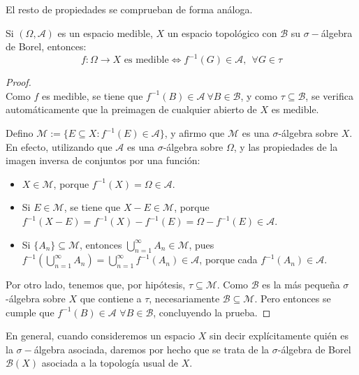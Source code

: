 El resto de propiedades se comprueban de forma análoga.

\begin{nprop}Si $(\Omega,\mathscr A)$ es un espacio medible, $X$ un espacio topológico con $\mathcal B$ su $\sigma-$álgebra de Borel, entonces:
  \[
    f: \Omega \to X \text{ es medible} \iff f^{-1}(G) \in \mathscr A, \ \ \forall G \in \tau
  \]
\end{nprop}

  \begin{proof} \hfill \\
	\boxed{\Rightarrow} Como $f$ es medible, se tiene que $f^{-1}(B) \in \mathscr A \ \forall B \in \mathcal B$, y como $\tau \subseteq \mathcal B$, se verifica automáticamente que la preimagen de cualquier abierto de $X$ es medible.

\boxed{\Leftarrow} Defino $\mathcal M := \{ E \subseteq X: f^{-1}(E) \in \mathscr A\}$, y afirmo que $\mathcal M$ es una $\sigma$-álgebra sobre $X$. En efecto, utilizando que $\mathscr A$ es una $\sigma$-álgebra sobre $\Omega$, y las propiedades de la imagen inversa de conjuntos por una función:

\begin{itemize}
	\item $X \in \mathcal M$, porque $f^{-1}(X) = \Omega \in \mathscr A$.

    \item Si $E \in \mathcal M$, se tiene que $X - E \in \mathcal M$, porque $f^{-1}(X-E) = f^{-1}(X) - f^{-1}(E) = \Omega - f^{-1}(E) \in \mathscr A$.

    \item Si $\{A_n\} \subseteq \mathcal M$, entonces $\bigcup_{n=1}^\infty A_n \in \mathcal M$, pues $f^{-1}\left( \bigcup_{n=1}^\infty A_n \right) = \bigcup_{n=1}^\infty f^{-1}(A_n) \in \mathscr A$, porque cada $f^{-1}(A_n) \in \mathscr A$.
\end{itemize}

Por otro lado, tenemos que, por hipótesis, $\tau \subseteq \mathcal M$. Como $\mathcal B$ es la más pequeña $\sigma$-álgebra sobre $X$ que contiene a $\tau$, necesariamente $\mathcal B \subseteq \mathcal M$. Pero entonces se cumple que \mbox{$f^{-1}(B) \in \mathscr A$} $\forall B \in \mathcal B$, concluyendo la prueba.
\end{proof}

En general, cuando consideremos un espacio $X$ sin decir explícitamente quién es la $\sigma-$álgebra asociada, daremos por hecho que se trata de la $\sigma$-álgebra de Borel $\mathcal B(X)$ asociada a la topología usual de $X$.

